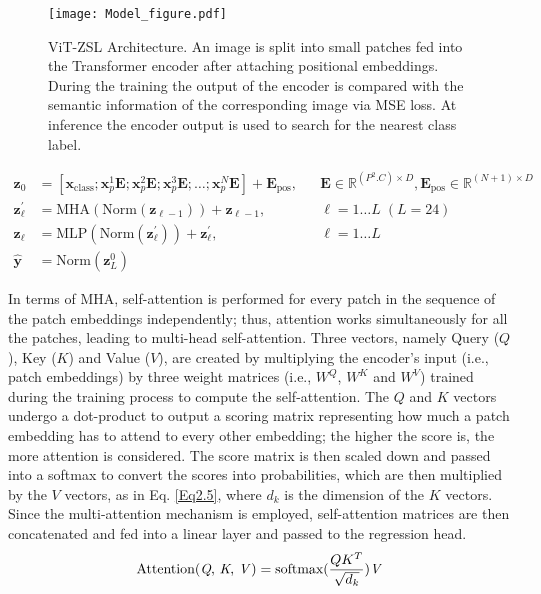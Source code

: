 \documentclass[a4paper,11pt]{article}
\newcommand{\anjan}[1]{\textcolor{red}{Anjan: #1}}
\begin{document}
\begin{figure} [!t]
\centering
\texttt{[image: Model\_figure.pdf]}
\vspace{-20pt}
\caption{ViT-ZSL Architecture. An image is split into small patches fed into the Transformer encoder after attaching positional embeddings. During the training the output of the encoder is compared with the semantic information of the corresponding image via MSE loss. At inference the encoder output is used to search for the nearest class label.}
\label{fig:Model}
\end{figure}

\vspace{-15pt}
\begin{align}
\mathbf{z}_0 &=[\mathbf{x}_\text{class}; \mathbf{x}^{1}_{p}\mathbf{E};\mathbf{x}^{2}_{p}\mathbf{E}; \mathbf{x}^{3}_{p}\mathbf{E}; \ldots; \mathbf{x}^{N}_{p}\mathbf{E}] + \mathbf{E}_\text{pos}, & &\mathbf{E} \in \mathbb{R}^{(P^2.C) \times D}, \mathbf{E}_\text{pos} \in \mathbb{R}^{(N+1) \times D} \label{Eq2.1}\\
\mathbf{z}^{\prime}_{\ell} &= \text{MHA}(\text{Norm}(\mathbf{z}_{\ell-1})) + \mathbf{z}_{\ell-1}, & &\ell = 1 \ldots L\;(L=24) \label{Eq2.2}\\
\mathbf{z}_{\ell}&=\text{MLP}(\text{Norm}(\mathbf{z}^{\prime}_{\ell})) + \mathbf{z}^{\prime}_{\ell}, & &\ell = 1 \ldots L \label{Eq2.3}\\
\mathbf{\hat{y}} &=\text{Norm}(\mathbf{z}^0_L) \label{Eq2.4}
\end{align}

In terms of MHA, self-attention is performed for every patch in the sequence of the patch embeddings independently; thus, attention works simultaneously for all the patches, leading to multi-head self-attention. Three vectors, namely Query ($Q$), Key ($K$) and Value ($V$), are created by multiplying the encoder's input (i.e., patch embeddings) by three weight matrices (i.e., $W^Q$, $W^K$ and $W^V$) trained during the training process to compute the self-attention. The $Q$ and $K$ vectors undergo a dot-product to output a scoring matrix representing how much a patch embedding has to attend to every other embedding; the higher the score is, the more attention is considered. The score matrix is then scaled down and passed into a softmax to convert the scores into probabilities, which are then multiplied by the $V$ vectors, as in Eq. \ref{Eq2.5}, where \textit{$d_k$} is the dimension of the $K$ vectors. Since the multi-attention mechanism is employed, self-attention matrices are then concatenated and fed into a linear layer and passed to the regression head. %
\begin{equation}
\text{Attention(\textit{Q}, \textit{K}, \textit{V})}= \text{softmax}(\frac{QK^{T}}{\sqrt{d_k}})\text{\textit{V}}
\label{Eq2.5}
\end{equation}
\end{document}
